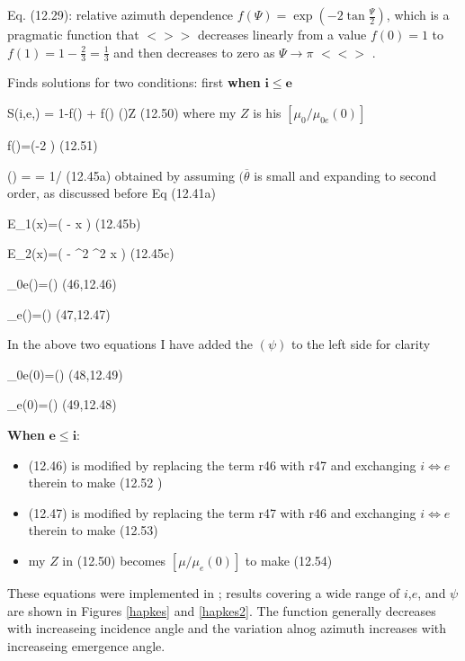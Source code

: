 \documentclass{article}
\newcommand{\qeq}{\hspace{25.mm}} %
\newcommand{\bq}{$ < \! > \!   \! >$ } %
\newcommand{\eq}{ $< \! \! < \! > $ } %
\begin{document}
 Eq. (12.29): relative azimuth dependence $f(\Psi)=\exp
  \left( -2 \tan \frac{\Psi}{2} \right)$, which is a pragmatic function that
  \bq decreases linearly from a value $f(0)=1$ to
  $f(1)=1-\frac{2}{3}=\frac{1}{3}$ and then decreases to zero as $\Psi
  \rightarrow \pi$ \eq.

  Finds solutions for two conditions: first \textbf{when} $\mathbf{i \leq e}$

 \qb S(i,e,\psi) =   
\frac{\chi(\overline{\theta})} {1-f(\psi) + f(\psi) \chi(\overline{\theta})Z} \qeq (12.50) \qe
 where my $Z$ is his $[ \mu_0 / \mu_{0e}(0)] $

\qb f(\psi)=\exp (-2 \tan {}) \qeq (12.51) \qe

\qb \chi(\overline{\theta}) = \langle \cos \vartheta \rangle = 1/ \qeq (12.45a) \qe obtained by assuming $(\overline{\theta}$ is small and expanding to second order, as discussed before Eq (12.41a)

\qb E_1(x)=\exp \left( - \cot  \overline{\theta} \cot x \right) \qeq (12.45b) \qe

\qb E_2(x)=\exp \left( - \cot^2  \overline{\theta} \cot^2 x \right) \qeq (12.45c) \qe

\qb \mu_{0e}(\psi)=\chi(\overline{\theta})    \qeq (46,12.46) \qe

\qb \mu_e(\psi)=\chi(\overline{\theta})    \qeq (47,12.47) \qe

In the above two equations I have added the $(\psi)$ to the left side for clarity

\qb \mu_{0e}(0)=\chi(\overline{\theta})    \qeq (48,12.49) \qe

\qb \mu_e(0)=\chi(\overline{\theta})    \qeq (49,12.48) \qe

 \textbf{When} $\mathbf{ e \leq i}$:
 
\begin{itemize}      %
\item 
 (12.46) is modified by replacing the term r46 with r47 and exchanging $i \Leftrightarrow e$ therein to make  (12.52 )
\item    (12.47) is modified by replacing the term r47 with r46 and exchanging $i \Leftrightarrow e$ therein to make  (12.53)    
\item my $Z$ in (12.50) becomes $[ \mu / \mu_e(0)] $ to make (12.54)

\end{itemize}
These equations were implemented in ; results covering a wide
range of $i$,$e$, and $\psi$ are shown in Figures \ref{hapkes} and
\ref{hapkes2}. The function generally decreases with increaseing incidence angle
and the variation alnog azimuth increases with increaseing emergence angle.
\end{document}
